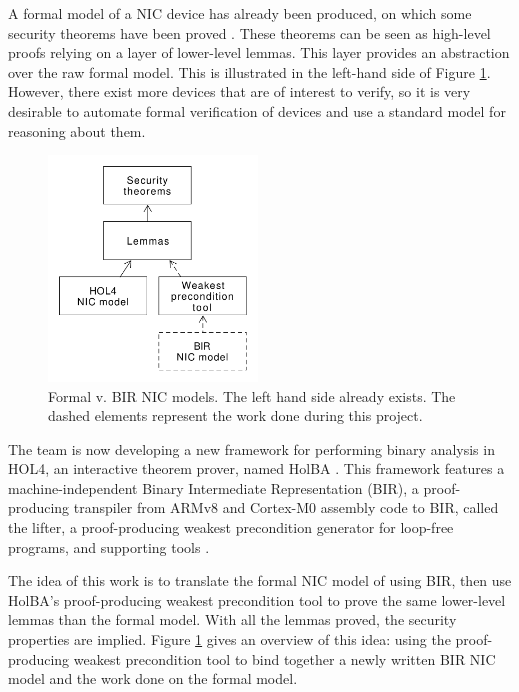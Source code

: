 \documentclass[10pt,a4paper]{article}
\begin{document}
\begin{multicols}{2}
A formal model of a {NIC} device has already been produced, on which some security theorems have been proved \cite{haglund_formal_2016}. These theorems can be seen as high-level proofs relying on a layer of lower-level lemmas. This layer provides an abstraction over the raw formal model. This is illustrated in the left-hand side of Figure \ref{hol-v-bir-nic-model-simple}. However, there exist more devices that are of interest to verify, so it is very desirable to automate formal verification of devices and use a standard model for reasoning about them.

\begin{figure}[H]
  \centering
	\includegraphics[height=6cm]{figures/hol-v-bir-nic-model-simple.png}
	\caption{Formal v. BIR NIC models. The left hand side already exists. The dashed elements represent the work done during this project.}
	\label{hol-v-bir-nic-model-simple}
\end{figure}

The team is now developing a new framework for performing binary analysis in HOL4, an interactive theorem prover, named {HolBA} \cite{noauthor_holba_2019}. This framework features a machine-independent Binary Intermediate Representation (BIR), a proof-producing transpiler from ARMv8 and Cortex-M0 assembly code to BIR, called the lifter, a proof-producing weakest precondition generator for loop-free programs, and supporting tools \cite{metere_sound_2017,lindner_trabin:_2019}.

The idea of this work is to translate the formal {NIC} model of \cite{haglund_formal_2016} using {BIR}, then use HolBA's proof-producing weakest precondition tool to prove the same lower-level lemmas than the formal model. With all the lemmas proved, the security properties are implied. Figure \ref{hol-v-bir-nic-model-simple} gives an overview of this idea: using the proof-producing weakest precondition tool to bind together a newly written BIR NIC model and the work done on the formal model.


\end{multicols}
\end{document}
